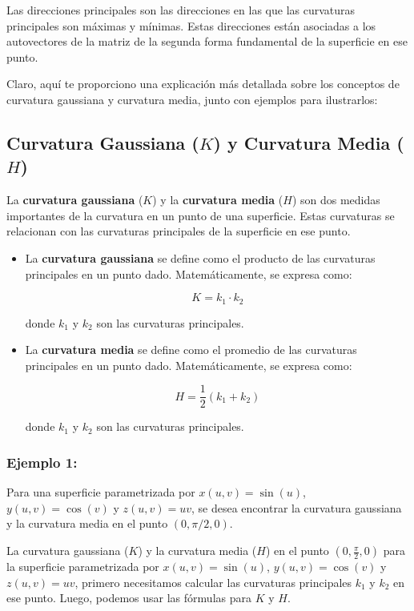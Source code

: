 \documentclass{article}
\begin{document}
	Las direcciones principales son las direcciones en las que las curvaturas principales son máximas y mínimas. Estas direcciones están asociadas a los autovectores de la matriz de la segunda forma fundamental de la superficie en ese punto.
	
	
	Claro, aquí te proporciono una explicación más detallada sobre los conceptos de curvatura gaussiana y curvatura media, junto con ejemplos para ilustrarlos:
	
	\subsection*{Curvatura Gaussiana ($K$) y Curvatura Media ($H$)}
	
	La \textbf{curvatura gaussiana} ($K$) y la \textbf{curvatura media} ($H$) son dos medidas importantes de la curvatura en un punto de una superficie. Estas curvaturas se relacionan con las curvaturas principales de la superficie en ese punto.
	
	\begin{itemize}
		\item La \textbf{curvatura gaussiana} se define como el producto de las curvaturas principales en un punto dado. Matemáticamente, se expresa como:
		
		$$ K = k_1 \cdot k_2 $$
		
		donde $k_1$ y $k_2$ son las curvaturas principales.
		
		\item La \textbf{curvatura media} se define como el promedio de las curvaturas principales en un punto dado. Matemáticamente, se expresa como:
		
		$$ H = \frac{1}{2}(k_1 + k_2) $$
		
		donde $k_1$ y $k_2$ son las curvaturas principales.
	\end{itemize}
	
	
	

	
	\subsubsection*{Ejemplo 1:}
	Para una superficie parametrizada por $x(u,v) = \sin(u)$, $y(u,v) = \cos(v)$ y $z(u,v) = uv$, se desea encontrar la curvatura gaussiana y la curvatura media en el punto $(0, \pi/2, 0)$.
	
	
	
	
	La curvatura gaussiana ($K$) y la curvatura media ($H$) en el punto $(0, \frac{\pi}{2}, 0)$ para la superficie parametrizada por $x(u, v) = \sin(u)$, $y(u, v) = \cos(v)$ y $z(u, v) = uv$, primero necesitamos calcular las curvaturas principales $k_1$ y $k_2$ en ese punto. Luego, podemos usar las fórmulas para $K$ y $H$.
	
\end{document}
